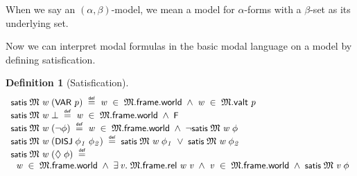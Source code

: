 \documentclass[letterpaper]{article}
\newtheorem{defn}{Definition}
\renewcommand{\HOLConst}[1]{{\textsf{\upshape\small #1}}}
\newenvironment{holmath}{\begin{displaymath}\begin{array}{l}}{\end{array}\end{displaymath}\ignorespacesafterend}
\begin{document}
When we say an $(\alpha,\beta)$-model, we mean a model for $\alpha$-forms with a $\beta$-set as its underlying set.

Now we can interpret modal formulas in the basic modal language on a model by defining satisfication.
\begin{defn}[Satisfication]
\begin{holmath}
  \HOLConst{satis}\;\HOLFreeVar{\ensuremath{\mathfrak{M}}}\;\HOLFreeVar{w}\;(\HOLConst{VAR}\;\HOLFreeVar{p})\;\HOLSymConst{\HOLTokenDefEquality{}}\;\HOLFreeVar{w}\;\HOLSymConst{\HOLTokenIn{}}\;\HOLFreeVar{\ensuremath{\mathfrak{M}}}.\HOLFieldName{frame}.\HOLFieldName{world}\;\HOLSymConst{\HOLTokenConj{}}\;\HOLFreeVar{w}\;\HOLSymConst{\HOLTokenIn{}}\;\HOLFreeVar{\ensuremath{\mathfrak{M}}}.\HOLFieldName{valt}\;\HOLFreeVar{p}\\
\HOLConst{satis}\;\HOLFreeVar{\ensuremath{\mathfrak{M}}}\;\HOLFreeVar{w}\;\HOLSymConst{\ensuremath{\bot}}\;\HOLSymConst{\HOLTokenDefEquality{}}\;\HOLFreeVar{w}\;\HOLSymConst{\HOLTokenIn{}}\;\HOLFreeVar{\ensuremath{\mathfrak{M}}}.\HOLFieldName{frame}.\HOLFieldName{world}\;\HOLSymConst{\HOLTokenConj{}}\;\HOLConst{F}\\
\HOLConst{satis}\;\HOLFreeVar{\ensuremath{\mathfrak{M}}}\;\HOLFreeVar{w}\;(\HOLSymConst{\HOLTokenNeg{}}\HOLFreeVar{\ensuremath{\phi}})\;\HOLSymConst{\HOLTokenDefEquality{}}\;\HOLFreeVar{w}\;\HOLSymConst{\HOLTokenIn{}}\;\HOLFreeVar{\ensuremath{\mathfrak{M}}}.\HOLFieldName{frame}.\HOLFieldName{world}\;\HOLSymConst{\HOLTokenConj{}}\;\HOLSymConst{\HOLTokenNeg{}}\HOLConst{satis}\;\HOLFreeVar{\ensuremath{\mathfrak{M}}}\;\HOLFreeVar{w}\;\HOLFreeVar{\ensuremath{\phi}}\\
\HOLConst{satis}\;\HOLFreeVar{\ensuremath{\mathfrak{M}}}\;\HOLFreeVar{w}\;(\HOLConst{DISJ}\;\HOLFreeVar{\ensuremath{\phi\sb{1}}}\;\HOLFreeVar{\ensuremath{\phi\sb{2}}})\;\HOLSymConst{\HOLTokenDefEquality{}}\;\HOLConst{satis}\;\HOLFreeVar{\ensuremath{\mathfrak{M}}}\;\HOLFreeVar{w}\;\HOLFreeVar{\ensuremath{\phi\sb{1}}}\;\HOLSymConst{\HOLTokenDisj{}}\;\HOLConst{satis}\;\HOLFreeVar{\ensuremath{\mathfrak{M}}}\;\HOLFreeVar{w}\;\HOLFreeVar{\ensuremath{\phi\sb{2}}}\\
\HOLConst{satis}\;\HOLFreeVar{\ensuremath{\mathfrak{M}}}\;\HOLFreeVar{w}\;(\HOLSymConst{\ensuremath{\Diamond}}\;\HOLFreeVar{\ensuremath{\phi}})\;\HOLSymConst{\HOLTokenDefEquality{}}\\
\;\;\HOLFreeVar{w}\;\HOLSymConst{\HOLTokenIn{}}\;\HOLFreeVar{\ensuremath{\mathfrak{M}}}.\HOLFieldName{frame}.\HOLFieldName{world}\;\HOLSymConst{\HOLTokenConj{}}\;\HOLSymConst{\HOLTokenExists{}}\HOLBoundVar{v}.\;\HOLFreeVar{\ensuremath{\mathfrak{M}}}.\HOLFieldName{frame}.\HOLFieldName{rel}\;\HOLFreeVar{w}\;\HOLBoundVar{v}\;\HOLSymConst{\HOLTokenConj{}}\;\HOLBoundVar{v}\;\HOLSymConst{\HOLTokenIn{}}\;\HOLFreeVar{\ensuremath{\mathfrak{M}}}.\HOLFieldName{frame}.\HOLFieldName{world}\;\HOLSymConst{\HOLTokenConj{}}\;\HOLConst{satis}\;\HOLFreeVar{\ensuremath{\mathfrak{M}}}\;\HOLBoundVar{v}\;\HOLFreeVar{\ensuremath{\phi}}
\end{holmath}
\end{defn}
\end{document}
